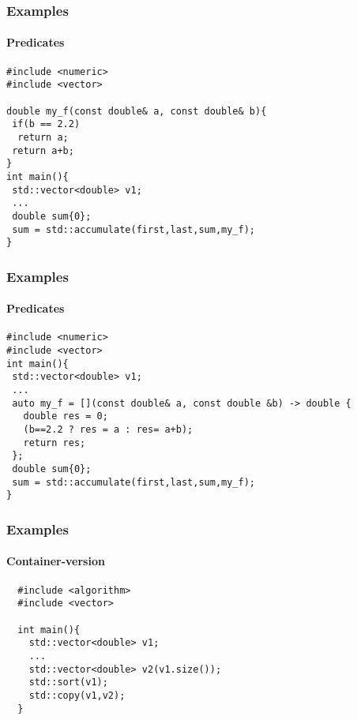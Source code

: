 \begin{frame}[fragile]
  \frametitle{Examples}
  \framesubtitle{Predicates}
\begin{lstlisting}
#include <numeric>
#include <vector>

double my_f(const double& a, const double& b){
 if(b == 2.2)
  return a;
 return a+b;
}
int main(){
 std::vector<double> v1;
 ...
 double sum{0};
 sum = std::accumulate(first,last,sum,my_f);
}
\end{lstlisting}

\end{frame}


\begin{frame}[fragile]
  \frametitle{Examples}
  \framesubtitle{Predicates}
\begin{lstlisting}
#include <numeric>
#include <vector>
int main(){
 std::vector<double> v1;
 ...
 auto my_f = [](const double& a, const double &b) -> double {
   double res = 0;
   (b==2.2 ? res = a : res= a+b);
   return res;
 };
 double sum{0};
 sum = std::accumulate(first,last,sum,my_f);
}
\end{lstlisting}

\end{frame}

\begin{frame}[fragile]
  \frametitle{Examples}
  \framesubtitle{Container-version}
\begin{lstlisting}
  #include <algorithm>
  #include <vector>
  
  int main(){
    std::vector<double> v1;
    ...
    std::vector<double> v2(v1.size());
    std::sort(v1);
    std::copy(v1,v2);
  }
\end{lstlisting}
\end{frame}

